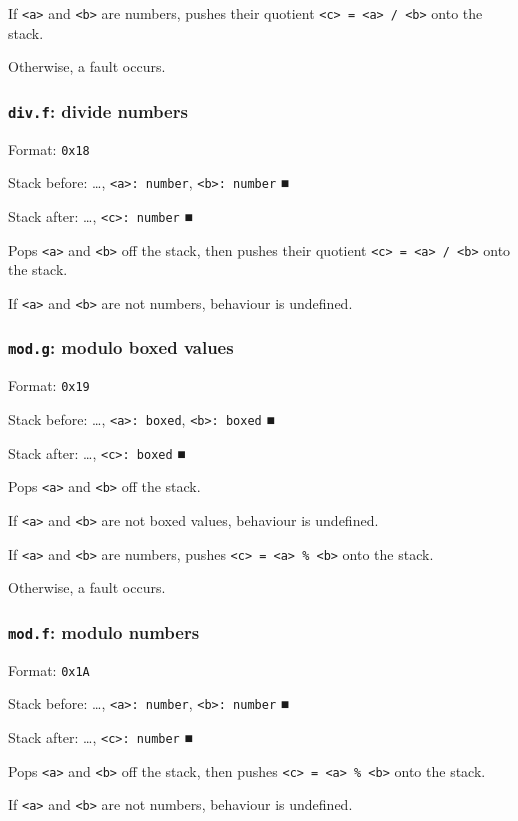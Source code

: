 If \texttt{<a>} and \texttt{<b>} are numbers, pushes their quotient \texttt{<c> = <a> / <b>}
onto the stack.

Otherwise, a fault occurs.

\subsubsection{\texttt{div.f}: divide numbers}
\label{sec:org9ea386e}
Format: \texttt{0x18}

Stack before: \ldots{}​, \texttt{<a>: number}, \texttt{<b>: number} ■

Stack after: \ldots{}​, \texttt{<c>: number} ■

Pops \texttt{<a>} and \texttt{<b>} off the stack, then pushes their quotient
\texttt{<c> = <a> / <b>} onto the stack.

If \texttt{<a>} and \texttt{<b>} are not numbers, behaviour is undefined.

\subsubsection{\texttt{mod.g}: modulo boxed values}
\label{sec:org6afbbf6}
Format: \texttt{0x19}

Stack before: \ldots{}​, \texttt{<a>: boxed}, \texttt{<b>: boxed} ■

Stack after: \ldots{}​, \texttt{<c>: boxed} ■

Pops \texttt{<a>} and \texttt{<b>} off the stack.

If \texttt{<a>} and \texttt{<b>} are not boxed values, behaviour is undefined.

If \texttt{<a>} and \texttt{<b>} are numbers, pushes \texttt{<c> = <a> \% <b>} onto the stack.

Otherwise, a fault occurs.

\subsubsection{\texttt{mod.f}: modulo numbers}
\label{sec:orgf4bf035}
Format: \texttt{0x1A}

Stack before: \ldots{}​, \texttt{<a>: number}, \texttt{<b>: number} ■

Stack after: \ldots{}​, \texttt{<c>: number} ■

Pops \texttt{<a>} and \texttt{<b>} off the stack, then pushes \texttt{<c> = <a> \% <b>} onto
the stack.

If \texttt{<a>} and \texttt{<b>} are not numbers, behaviour is undefined.

